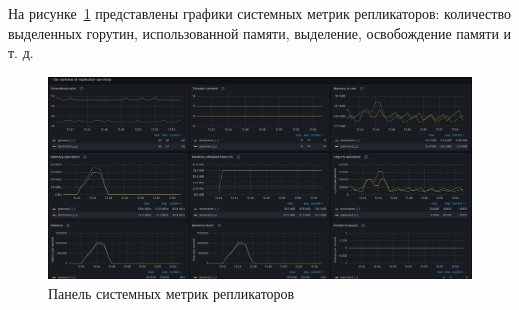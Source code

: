 На рисунке~\ref{fig:fig07} представлены графики системных метрик репликаторов: количество выделенных
горутин, использованной памяти, выделение, освобождение памяти и т. д.

\begin{figure}
  \centering
  \includegraphics[scale=0.2]{assets/go_runtime_graph.jpeg}
  \caption{Панель системных метрик репликаторов}
  \label{fig:fig07}
\end{figure}
